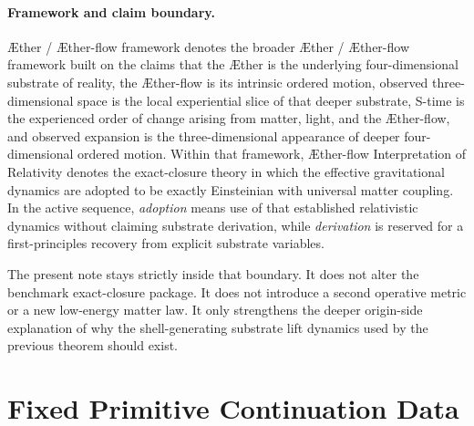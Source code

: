 \documentclass[11pt]{article}
\newcommand{\Aether}{\AE{}ther}
\newcommand{\Aflow}{\AE{}ther-flow}
\newcommand{\TheoryName}{\Aflow{} Interpretation of Relativity}
\newcommand{\TheoryProgram}{\Aether{} / \Aflow{} framework}
\begin{document}
\paragraph{Framework and claim boundary.}
\TheoryProgram{} denotes the broader \Aether{} / \Aflow{} framework built on the claims that the \Aether{} is the underlying four-dimensional substrate of reality, the \Aflow{} is its intrinsic ordered motion, observed three-dimensional space is the local experiential slice of that deeper substrate, S-time is the experienced order of change arising from matter, light, and the \Aflow{}, and observed expansion is the three-dimensional appearance of deeper four-dimensional ordered motion. Within that framework, \TheoryName{} denotes the exact-closure theory in which the effective gravitational dynamics are adopted to be exactly Einsteinian with universal matter coupling. In the active sequence, \emph{adoption} means use of that established relativistic dynamics without claiming substrate derivation, while \emph{derivation} is reserved for a first-principles recovery from explicit substrate variables.

The present note stays strictly inside that boundary. It does not alter the benchmark exact-closure package. It does not introduce a second operative metric or a new low-energy matter law. It only strengthens the deeper origin-side explanation of why the shell-generating substrate lift dynamics used by the previous theorem should exist.

\section{Fixed Primitive Continuation Data}
\end{document}
